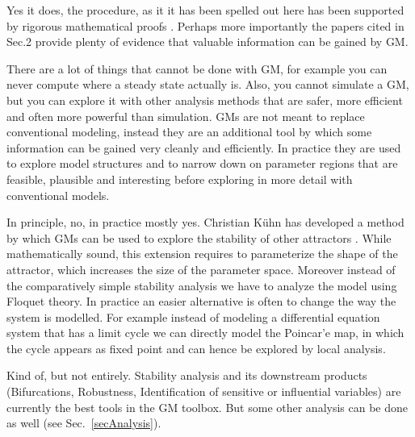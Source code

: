 \documentclass{article}
\begin{document}
Yes it does, the procedure, as it it has been spelled out here has been supported by rigorous mathematical proofs \citep{Kuehn2013AppMath}. Perhaps more importantly the papers cited in Sec.2 provide plenty of evidence that valuable information can be gained by GM.\vspace{2mm}

There are a lot of things that cannot be done with GM, for example you can never compute where a steady state actually is. Also, you cannot simulate a GM, but you can explore it with other analysis methods that are safer, more efficient and often more powerful than simulation. GMs are not meant to replace conventional modeling, instead they are an additional tool by which some information can be gained very cleanly and efficiently. In practice they are used to explore model structures and to narrow down on parameter regions that are feasible, plausible and interesting before exploring in more detail with conventional models. \vspace{2mm}

In principle, no, in practice mostly yes. Christian K\"uhn has developed a method by which GMs can be used to explore the stability of other attractors \cite{Kuehn2013DCDS}. While mathematically sound, this extension requires to parameterize the shape of the attractor, which increases the size of the parameter space. Moreover instead of the comparatively simple stability analysis we have to analyze the model using Floquet theory. In practice an easier alternative is often to change the way the system is modelled. For example instead of modeling a differential equation system that has a limit cycle we can directly model the Poincar'e map, in which the cycle appears as fixed point and can hence be explored by local analysis. \vspace{2mm}

Kind of, but not entirely. Stability analysis and its downstream products (Bifurcations, Robustness, Identification of sensitive or influential variables) are currently the best tools in the GM toolbox. But some other analysis can be done as well (see Sec.~\ref{secAnalysis}). \vspace{2mm}
\end{document}
